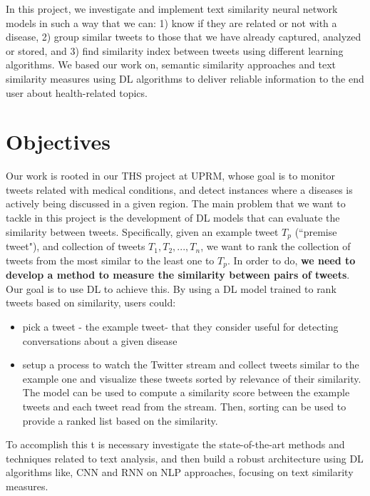 \documentclass[12pt]{report}
\begin{document}
	In this project, we investigate and implement text similarity neural network models in such a way that we can: 1) know if they are related or not with a disease, 2) group similar tweets to those that we have already captured, analyzed or stored, and 3) find similarity index between tweets using different learning algorithms. We based our work on, semantic similarity approaches and text similarity measures using \ac{DL} algorithms to deliver reliable information to the end user about health-related topics.
	
	
	\section{Objectives}
	
	Our work is rooted in our \ac{THS} project at UPRM, whose goal is to monitor tweets related with medical conditions, and detect instances where
a diseases is actively being discussed in a given region.
The main problem that we want to tackle in this project is the development of  \ac{DL} models that can evaluate the similarity between
tweets. Specifically, given an example tweet $T_p$ (``premise tweet"), and  collection of tweets $T_1, T_2, ..., T_n$, we want to rank the collection of tweets
from the most similar to the least one to $T_p$. In order to do, {\bf we need to develop a method to measure the similarity between pairs of 
	tweets}. Our goal is to use \ac{DL} to achieve this. 
By using a \ac{DL} model trained to rank tweets based on similarity, users could: 
\begin{itemize}
	\item pick a tweet - the example tweet- that they consider useful for detecting conversations about a given disease 
	\item setup a process to watch the Twitter stream and collect tweets similar  to the example one and visualize these tweets  sorted by 
	relevance of their similarity. The model can be used to compute a similarity score between the example tweets and each tweet read from the stream. Then, sorting can be used to provide a ranked list based on the similarity.
\end{itemize} 

To accomplish this t is necessary investigate the state-of-the-art methods and techniques related to text analysis, and then build a robust architecture using \ac{DL} algorithms like, \ac{CNN} and \ac{RNN} on \ac{NLP} approaches,  focusing on text similarity measures.
\end{document}
